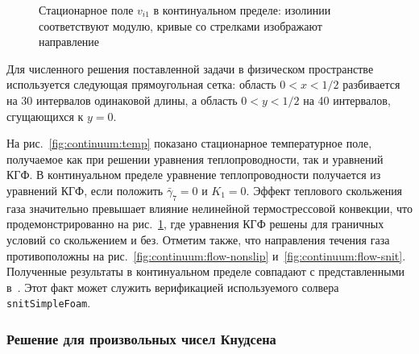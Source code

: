 \documentclass[
aps,%
12pt,%
final,%
notitlepage,%
oneside,%
onecolumn,%
nobibnotes,%
nofootinbib,%
superscriptaddress,%
noshowpacs,%
showkeys,%
floatfix,%
tightenlines,%
centertags]%
{revtex4}
\begin{document}
\begin{figure}
    \centering
    \caption{Стационарное поле \(v_{i1}\) в континуальном пределе:
        изолинии соответствуют модулю, кривые со стрелками изображают направление}
    \label{fig:continuum:flow}
\end{figure}

Для численного решения поставленной задачи в физическом пространстве
используется следующая прямоугольная сетка:
область \(0<x<1/2\) разбивается на 30 интервалов одинаковой длины,
а область \(0<y<1/2\) на 40 интервалов, сгущающихся к \(y=0\).

На рис.~\ref{fig:continuum:temp} показано стационарное температурное поле,
получаемое как при решении уравнения теплопроводности, так и уравнений КГФ.
В континуальном пределе уравнение теплопроводности получается из уравнений КГФ,
если положить \(\bar{\gamma}_7=0\) и \(K_1=0\).
Эффект теплового скольжения газа значительно превышает влияние нелинейной термострессовой конвекции,
что продемонстрированно на рис.~\ref{fig:continuum:flow}, где уравнения КГФ решены
для граничных условий со скольжением и без.
Отметим также, что направления течения газа противоположны на рис.~\ref{fig:continuum:flow-nonslip}
и~\ref{fig:continuum:flow-snit}.
Полученные результаты в континуальном пределе совпадают с представленными в~\cite{Sone1996}.
Этот факт может служить верификацией используемого солвера \verb+snitSimpleFoam+.

\subsubsection{Решение для произвольных чисел Кнудсена}
\end{document}
